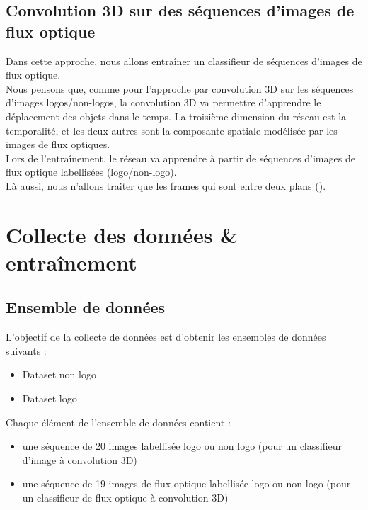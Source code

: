 \documentclass[11pt]{article}
\begin{document}
\subsection{Convolution 3D sur des séquences d'images de flux optique}
\label{sec:org7eea183}
Dans cette approche, nous allons entraîner un classifieur de séquences d'images de flux optique.\\
Nous pensons que, comme pour l'approche par convolution 3D sur les séquences d'images logos/non-logos, la convolution 3D va permettre d'apprendre le déplacement des objets dans le temps. La troisième dimension du réseau est la temporalité, et les deux autres sont la composante spatiale modélisée par les images de flux optiques.\\
Lors de l'entraînement, le réseau va apprendre à partir de séquences d'images de flux optique labellisées (logo/non-logo).\\
Là aussi, nous n'allons traiter que les frames qui sont entre deux plans (\cite{Abd_Almageed_2008}).\\

\newpage
\section{Collecte des données \& entraînement}
\label{sec:orgdfabe6f}
\subsection{Ensemble de données}
\label{sec:org7257dac}
L'objectif de la collecte de données est d'obtenir les ensembles de données suivants :\\
\begin{itemize}
\item Dataset non logo\\
\item Dataset logo\\
\end{itemize}
Chaque élément de l'ensemble de données contient :\\
\begin{itemize}
\item une séquence de 20 images labellisée logo ou non logo (pour un classifieur d'image à convolution 3D)\\
\item une séquence de 19 images de flux optique labellisée logo ou non logo (pour un classifieur de flux optique à convolution 3D)\\
\end{itemize}
\end{document}
